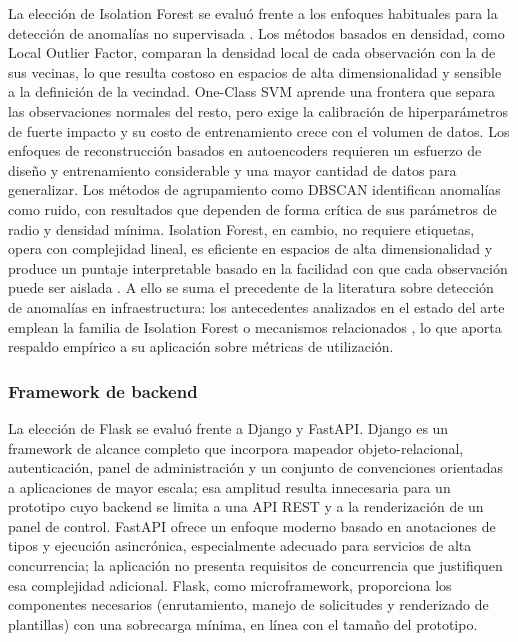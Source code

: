 La elección de Isolation Forest se evaluó frente a los enfoques habituales para la detección de anomalías no supervisada \parencite{Chandola2009}. Los métodos basados en densidad, como Local Outlier Factor, comparan la densidad local de cada observación con la de sus vecinas, lo que resulta costoso en espacios de alta dimensionalidad y sensible a la definición de la vecindad. One-Class SVM aprende una frontera que separa las observaciones normales del resto, pero exige la calibración de hiperparámetros de fuerte impacto y su costo de entrenamiento crece con el volumen de datos. Los enfoques de reconstrucción basados en autoencoders requieren un esfuerzo de diseño y entrenamiento considerable y una mayor cantidad de datos para generalizar. Los métodos de agrupamiento como DBSCAN identifican anomalías como ruido, con resultados que dependen de forma crítica de sus parámetros de radio y densidad mínima. Isolation Forest, en cambio, no requiere etiquetas, opera con complejidad lineal, es eficiente en espacios de alta dimensionalidad y produce un puntaje interpretable basado en la facilidad con que cada observación puede ser aislada \parencite{Liu2008}. A ello se suma el precedente de la literatura sobre detección de anomalías en infraestructura: los antecedentes analizados en el estado del arte emplean la familia de Isolation Forest o mecanismos relacionados \parencite{Zou2022, Natterdal2024, Nawrocki2022}, lo que aporta respaldo empírico a su aplicación sobre métricas de utilización.

\subsubsection{Framework de backend}

La elección de Flask se evaluó frente a Django y FastAPI. Django es un framework de alcance completo que incorpora mapeador objeto-relacional, autenticación, panel de administración y un conjunto de convenciones orientadas a aplicaciones de mayor escala; esa amplitud resulta innecesaria para un prototipo cuyo backend se limita a una API REST y a la renderización de un panel de control. FastAPI ofrece un enfoque moderno basado en anotaciones de tipos y ejecución asincrónica, especialmente adecuado para servicios de alta concurrencia; la aplicación no presenta requisitos de concurrencia que justifiquen esa complejidad adicional. Flask, como microframework, proporciona los componentes necesarios (enrutamiento, manejo de solicitudes y renderizado de plantillas) con una sobrecarga mínima, en línea con el tamaño del prototipo.

